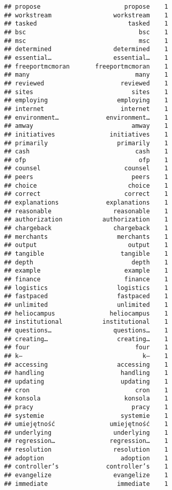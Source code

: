 \documentclass[]{article}
\begin{document}
\begin{verbatim}
## propose                       propose    1
## workstream                 workstream    1
## tasked                         tasked    1
## bsc                               bsc    1
## msc                               msc    1
## determined                 determined    1
## essential…                 essential…    1
## freeportmcmoran       freeportmcmoran    1
## many                             many    1
## reviewed                     reviewed    1
## sites                           sites    1
## employing                   employing    1
## internet                     internet    1
## environment…             environment…    1
## amway                           amway    1
## initiatives               initiatives    1
## primarily                   primarily    1
## cash                             cash    1
## ofp                               ofp    1
## counsel                       counsel    1
## peers                           peers    1
## choice                         choice    1
## correct                       correct    1
## explanations             explanations    1
## reasonable                 reasonable    1
## authorization           authorization    1
## chargeback                 chargeback    1
## merchants                   merchants    1
## output                         output    1
## tangible                     tangible    1
## depth                           depth    1
## example                       example    1
## finance                       finance    1
## logistics                   logistics    1
## fastpaced                   fastpaced    1
## unlimited                   unlimited    1
## heliocampus               heliocampus    1
## institutional           institutional    1
## questions…                 questions…    1
## creating…                   creating…    1
## four                             four    1
## k–                                 k–    1
## accessing                   accessing    1
## handling                     handling    1
## updating                     updating    1
## cron                             cron    1
## konsola                       konsola    1
## pracy                           pracy    1
## systemie                     systemie    1
## umiejętność               umiejętność    1
## underlying                 underlying    1
## regression…               regression…    1
## resolution                 resolution    1
## adoption                     adoption    1
## controller’s             controller’s    1
## evangelize                 evangelize    1
## immediate                   immediate    1

\end{verbatim}
\end{document}
